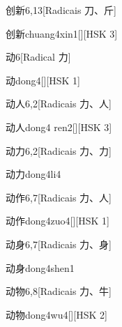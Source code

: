 \begin{entry}{创新}{6,13}[Radicais ⼑、⽄]
  \begin{phonetics}{创新}{chuang4xin1}[][HSK 3]
  \end{phonetics}
\end{entry}

\begin{entry}{动}{6}[Radical ⼒]
  \begin{phonetics}{动}{dong4}[][HSK 1]
  \end{phonetics}
\end{entry}

\begin{entry}{动人}{6,2}[Radicais ⼒、⼈]
  \begin{phonetics}{动人}{dong4 ren2}[][HSK 3]
  \end{phonetics}
\end{entry}

\begin{entry}{动力}{6,2}[Radicais ⼒、⼒]
  \begin{phonetics}{动力}{dong4li4}
  \end{phonetics}
\end{entry}

\begin{entry}{动作}{6,7}[Radicais ⼒、⼈]
  \begin{phonetics}{动作}{dong4zuo4}[][HSK 1]
  \end{phonetics}
\end{entry}

\begin{entry}{动身}{6,7}[Radicais ⼒、⾝]
  \begin{phonetics}{动身}{dong4shen1}
  \end{phonetics}
\end{entry}

\begin{entry}{动物}{6,8}[Radicais ⼒、⽜]
  \begin{phonetics}{动物}{dong4wu4}[][HSK 2]
  \end{phonetics}
\end{entry}

